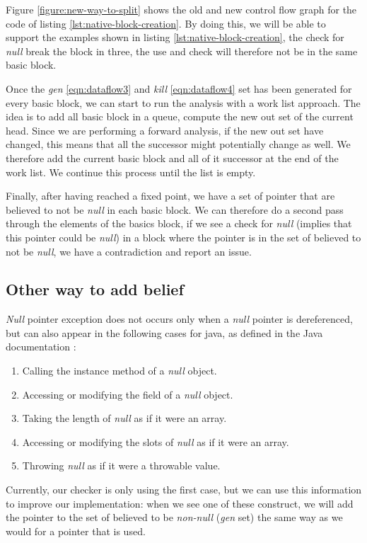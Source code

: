 Figure \ref{figure:new-way-to-split} shows the old and new control flow graph for the code of listing \ref{lst:native-block-creation}. 
By doing this, we will be able to support the examples shown in listing \ref{lst:native-block-creation}, the check for \emph{null} break the block in three, the use and check will therefore not be in the same basic block.

Once the \emph{gen} \ref{eqn:dataflow3} and \emph{kill} \ref{eqn:dataflow4} set has been generated for every basic block, we can start to run the analysis with a work list approach.
The idea is to add all basic block in a queue, compute the new out set of the current head. 
Since we are performing a forward analysis, if the new out set have changed, this means that all the successor might potentially change as well. 
We therefore add the current basic block and all of it successor at the end of the work list. 
We continue this process until the list is empty.

Finally, after having reached a fixed point, we have a set of pointer that are believed to not be \emph{null} in each basic block.
We can therefore do a second pass through the elements of the basics block, if we see a check for \emph{null} (implies that this pointer could be \emph{null}) in a block where the pointer is in the set of believed to not be \emph{null}, we have a contradiction and report an issue.

\subsection{Other way to add belief}
\label{subsec:other_way_to_add_belief}

\emph{Null} pointer exception does not occurs only when a \emph{null} pointer is dereferenced, but can also appear in the following cases for java, as defined in the Java documentation \cite{OracleDoc:2019:Online}:

\begin{enumerate}
	\item Calling the instance method of a \emph{null} object. \newline 
	\item Accessing or modifying the field of a \emph{null} object. \newline 
	\item Taking the length of \emph{null} as if it were an array. \newline 
	\item Accessing or modifying the slots of \emph{null} as if it were an array. \newline 
	\item Throwing \emph{null} as if it were a throwable value. \newline 
\end{enumerate}

Currently, our checker is only using the first case, but we can use this information to improve our implementation: when we see one of these construct, we will add the pointer to the set of believed to be \emph{non-null} (\emph{gen} set) the same way as we would for a pointer that is used.


